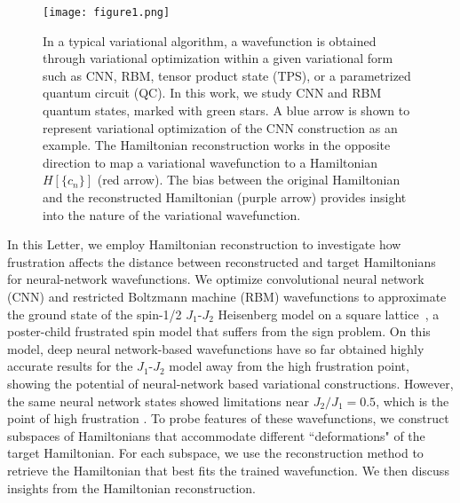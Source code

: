 \documentclass[amsmath,amssymb,aps,prl,superscriptaddress,twocolumn,floatfix]{revtex4}
\begin{document}
\begin{figure}[t]
    \centering
    \texttt{[image: figure1.png]}
    \caption{In a typical variational algorithm, a wavefunction is obtained through variational optimization within a given variational form such as CNN, RBM, tensor product state (TPS), or a parametrized quantum circuit (QC).
    In this work, we study CNN and RBM quantum states, marked with green stars.
    A blue arrow is shown to represent variational optimization of the CNN construction as an example.
    The Hamiltonian reconstruction works in the opposite direction to map a variational wavefunction 
    to a Hamiltonian $H[\{c_n\}]$ (red arrow).
    The bias between the original Hamiltonian and the reconstructed Hamiltonian (purple arrow) provides insight into the nature of the variational wavefunction.}
    \label{fig:overview}
\end{figure}


In this Letter, we employ Hamiltonian reconstruction to investigate how frustration affects the distance between reconstructed and target Hamiltonians for neural-network wavefunctions. %
We optimize convolutional neural network (CNN) and restricted Boltzmann machine (RBM) wavefunctions to approximate the ground state of %
the spin-1/2 $J_1$-$J_2$ Heisenberg model on a square lattice~\cite{PhysRevB.100.125124}, a poster-child frustrated spin model that suffers from the sign problem.
 On this model, deep neural network-based wavefunctions have so far obtained highly accurate results for the $J_1$-$J_2$ model away from the high frustration point, showing the potential of neural-network based variational constructions.
However, the same neural network states showed limitations near $J_2/J_1 = 0.5$, which is the point of high frustration \cite{PhysRevB.100.125124}. 
To probe features of these wavefunctions, we construct subspaces of Hamiltonians that accommodate different ``deformations" of the target Hamiltonian.
For each subspace, we use the reconstruction method to retrieve the Hamiltonian that best fits the trained wavefunction.
We then discuss insights from the Hamiltonian reconstruction. 
\end{document}
